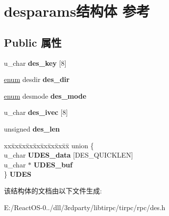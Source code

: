 \hypertarget{structdesparams}{}\section{desparams结构体 参考}
\label{structdesparams}
\subsection*{Public 属性}
\begin{DoxyCompactItemize}
\item 
\mbox{\label{structdesparams_a8ae2e8ab542c0f351921a7a7cd2846cc}} 
u\+\_\+char {\bfseries des\+\_\+key} \mbox{[}8\mbox{]}
\item 
\mbox{\label{structdesparams_aa8e1d6c2e03f8019919ef3dfc30da9ae}} 
\hyperlink{interfaceenum}{enum} desdir {\bfseries des\+\_\+dir}
\item 
\mbox{\label{structdesparams_a5b91a951732bf73e71254fe8067662e4}} 
\hyperlink{interfaceenum}{enum} desmode {\bfseries des\+\_\+mode}
\item 
\mbox{\label{structdesparams_a1a0ab1f69b5b160f141d94bd145b23f9}} 
u\+\_\+char {\bfseries des\+\_\+ivec} \mbox{[}8\mbox{]}
\item 
\mbox{\label{structdesparams_a192b492be24149508cd49302ea16b357}} 
unsigned {\bfseries des\+\_\+len}
\item 
\mbox{\label{structdesparams_a2d5e1e735f7b7b6869b2b20bc4133ee2}} 
\begin{tabbing}
xx\=xx\=xx\=xx\=xx\=xx\=xx\=xx\=xx\=\kill
union \{\\
\>u\_char {\bfseries UDES\_data} \mbox{[}DES\_QUICKLEN\mbox{]}\\
\>u\_char $\ast$ {\bfseries UDES\_buf}\\
\} {\bfseries UDES}\\

\end{tabbing}\end{DoxyCompactItemize}


该结构体的文档由以下文件生成\+:\begin{DoxyCompactItemize}
\item 
E\+:/\+React\+O\+S-\/0../dll/3rdparty/libtirpc/tirpc/rpc/des.\+h\end{DoxyCompactItemize}
